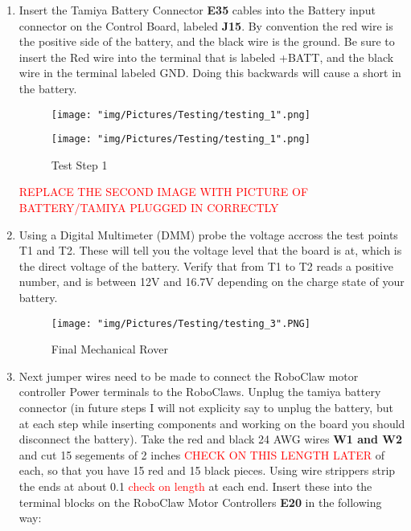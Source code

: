 \documentclass[12pt]{article}
\begin{document}
\begin{enumerate}

\item Insert the Tamiya Battery Connector \textbf{E35} cables into the Battery input connector on the Control Board, labeled \textbf{J15}. By convention the red wire is the positive side of the battery, and the black wire is the ground. Be sure to insert the Red wire into the terminal that is labeled +BATT, and the black wire in the terminal labeled GND. Doing this backwards will cause a short in the battery. 

\begin{figure}[H]
  \centering
  \begin{minipage}[b]{0.45\textwidth}
    \texttt{[image: "img/Pictures/Testing/testing\_1".png]}
  \end{minipage}
  \hfill
  \begin{minipage}[b]{0.45\textwidth}
    \texttt{[image: "img/Pictures/Testing/testing\_1".png]}
  \end{minipage}
  \caption{Test Step 1}
  \label{test_1}
\end{figure}

\textcolor{red}{REPLACE THE SECOND IMAGE WITH PICTURE OF BATTERY/TAMIYA PLUGGED IN CORRECTLY}

\item Using a Digital Multimeter (DMM) probe the voltage accross the test points T1 and T2. These will tell you the voltage level that the board is at, which is the direct voltage of the battery. Verify that from T1 to T2 reads a positive number, and is between 12V and 16.7V depending on the charge state of your battery. 

\begin{figure}[H]
  \centering
    \texttt{[image: "img/Pictures/Testing/testing\_3".PNG]}
  \caption{Final Mechanical Rover}
  \label{final mechanical rover}
\end{figure}

\item Next jumper wires need to be made to connect the RoboClaw motor controller Power terminals to the RoboClaws. Unplug the tamiya battery connector (in future steps I will not explicity say to unplug the battery, but at each step while inserting components and working on the board you should disconnect the battery). Take the red and black 24 AWG wires \textbf{W1 and W2} and cut 15 segements of 2 inches \textcolor{red}{CHECK ON THIS LENGTH LATER} of each, so that you have 15 red and 15 black pieces. Using wire strippers strip the ends at about 0.1 \textcolor{red}{check on length} at each end. Insert these into the terminal blocks on the RoboClaw Motor Controllers \textbf{E20} in the following way:


\end{enumerate}
\end{document}
